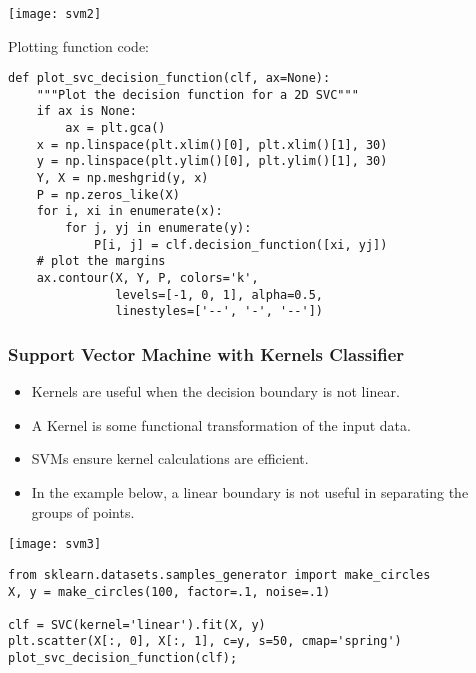 \begin{frame}[fragile]\frametitle{}

\begin{center}
\texttt{[image: svm2]}
\end{center}

Plotting function code:
\begin{lstlisting}
def plot_svc_decision_function(clf, ax=None):
    """Plot the decision function for a 2D SVC"""
    if ax is None:
        ax = plt.gca()
    x = np.linspace(plt.xlim()[0], plt.xlim()[1], 30)
    y = np.linspace(plt.ylim()[0], plt.ylim()[1], 30)
    Y, X = np.meshgrid(y, x)
    P = np.zeros_like(X)
    for i, xi in enumerate(x):
        for j, yj in enumerate(y):
            P[i, j] = clf.decision_function([xi, yj])
    # plot the margins
    ax.contour(X, Y, P, colors='k',
               levels=[-1, 0, 1], alpha=0.5,
               linestyles=['--', '-', '--'])
\end{lstlisting}

\end{frame}

\begin{frame}[fragile]\frametitle{Support Vector Machine with Kernels Classifier}



\begin{itemize}
\item Kernels are useful when the decision boundary is not linear. 
\item A Kernel is some functional transformation of the input data. 
\item SVMs ensure kernel calculations are efficient. 
\item In the example below, a linear boundary is not useful in separating the groups of points.
\end{itemize}

\begin{center}
\texttt{[image: svm3]}
\end{center}


\begin{lstlisting}
from sklearn.datasets.samples_generator import make_circles
X, y = make_circles(100, factor=.1, noise=.1)

clf = SVC(kernel='linear').fit(X, y)
plt.scatter(X[:, 0], X[:, 1], c=y, s=50, cmap='spring')
plot_svc_decision_function(clf);
\end{lstlisting}

\end{frame}

